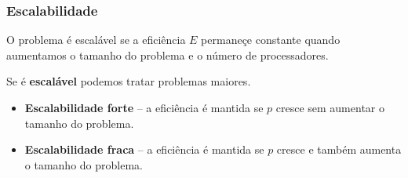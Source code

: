 \documentclass[xcolor={usenames,dvipsnames},12pt,presentation,aspectratio=169]{beamer}
\begin{document}
\begin{frame}[fragile]
  \frametitle{Escalabilidade}
  O problema é escalável se a  eficiência $E$ permaneçe constante quando aumentamos o tamanho do problema e o número de processadores.

  Se é \textbf{escalável} podemos tratar problemas maiores.
\begin{itemize}
  \item \textbf{Escalabilidade forte} -- a eficiência é mantida se $p$ cresce sem aumentar o tamanho do problema.
  \item \textbf{Escalabilidade fraca} -- a eficiência é mantida se $p$ cresce e também aumenta o tamanho do problema.
\end{itemize}
\end{frame}
\end{document}
